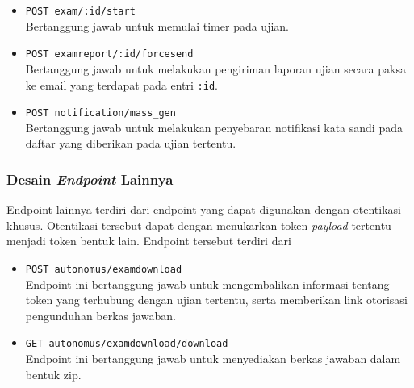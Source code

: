 \begin{itemize}
        \item \texttt{POST exam/:id/start} \\
            Bertanggung jawab untuk memulai timer pada ujian.
            
        \item \texttt{POST examreport/:id/forcesend} \\
            Bertanggung jawab untuk melakukan pengiriman laporan ujian secara paksa ke email
            yang terdapat pada entri \texttt{:id}.
            
        \item \texttt{POST notification/mass\_gen} \\
            Bertanggung jawab untuk melakukan penyebaran notifikasi kata sandi pada daftar yang
            diberikan pada ujian tertentu.
    \end{itemize}
    
\subsubsection{Desain \textit{Endpoint} Lainnya}
    Endpoint lainnya terdiri dari endpoint yang dapat digunakan dengan otentikasi khusus. Otentikasi tersebut
    dapat dengan menukarkan token \textit{payload} tertentu menjadi token bentuk lain. Endpoint tersebut
    terdiri dari
    \begin{itemize}
        \item \texttt{POST autonomus/examdownload} \\
            Endpoint ini bertanggung jawab untuk mengembalikan informasi tentang token yang terhubung
            dengan ujian tertentu, serta memberikan link otorisasi pengunduhan berkas jawaban.
            
        \item \texttt{GET autonomus/examdownload/download} \\
            Endpoint ini bertanggung jawab untuk menyediakan berkas jawaban dalam bentuk zip.
    \end{itemize}
    
